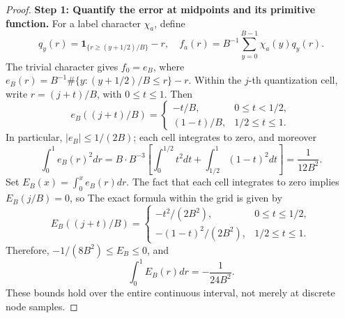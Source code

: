 \documentclass[a4paper,11pt]{article}
\theoremstyle{remark}
\begin{document}
\begin{proof}
\textbf{Step 1: Quantify the error at midpoints and its primitive function.}
For a label character $\chi_a$, define
\[
 q_y(r)=\mathbf1_{\{r\ge(y+1/2)/B\}}-r,
 \quad f_a(r)=B^{-1}\sum_{y=0}^{B-1}\chi_a(y)q_y(r).
\]
The trivial character gives $f_0=e_B$, where
$e_B(r)=B^{-1}\#\{y:(y+1/2)/B\le r\}-r$.
Within the $j$-th quantization cell, write $r=(j+t)/B$, with $0\le t\le1$. Then
\[
 e_B((j+t)/B)=\begin{cases}-t/B,&0\le t<1/2,\\(1-t)/B,&1/2\le t\le1.
 \end{cases}
\]
In particular, $|e_B|\le1/(2B)$; each cell integrates to zero, and moreover
\[
 \int_0^1e_B(r)^2dr
 =B\cdot B^{-3}\left[\int_0^{1/2}t^2dt+
 \int_{1/2}^1(1-t)^2dt\right]=\frac1{12B^2}.
\]
Set $E_B(x)=\int_0^xe_B(r)dr$. The fact that each cell integrates to zero implies $E_B(j/B)=0$, so
The exact formula within the grid is given by
\[
 E_B((j+t)/B)=\begin{cases}-t^2/(2B^2),&0\le t\le1/2,\\
 -(1-t)^2/(2B^2),&1/2\le t\le1.
 \end{cases}
\]
Therefore, $-1/(8B^2)\le E_B\le0$, and
\[
 \int_0^1E_B(r)dr=-\frac1{24B^2}.
\]
These bounds hold over the entire continuous interval, not merely at discrete node samples.


\end{proof}
\end{document}
